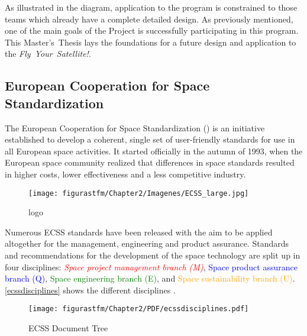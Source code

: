 As illustrated in the diagram, application to the program is constrained to those teams which already have a complete detailed design. As previously mentioned, one of the main goals of the  Project is successfully participating in this program. This Master's~Thesis lays the foundations for a future  design and application to the \textit{Fly~Your~Satellite!}.


\subsection{European Cooperation for Space Standardization}\label{sec:ECSS}


The European Cooperation for Space Standardization () is an initiative established to develop a coherent, single set of user-friendly standards for use in all European space activities. It started officially in the autumn of 1993, when the European space community realized that differences in space standards resulted in higher costs, lower effectiveness and a less competitive industry.

\begin{figure}[H]
				\centering
				\texttt{[image: figurastfm/Chapter2/Imagenes/ECSS\_large.jpg]}
				\vspace{0.3cm}
				\caption{ logo \cite{ecss}}
								\vspace{-1cm}

\end{figure}

Numerous ECSS standards have been released with the aim to be applied altogether for the management, engineering and product assurance. Standards and recommendations for the development of the space technology are split up in four disciplines: \textit{\textcolor{red}{Space project management branch (M)}}, \textcolor{blue}{Space product assurance branch (Q)}, \textcolor{green}{Space engineering branch (E)}, and \textcolor{orange}{Space sustainability branch (U)}. \autoref{ecssdisciplines} shows the different  disciplines \cite{ecssdescrip}.

		\begin{figure}[h]
			\centering
			\texttt{[image: figurastfm/Chapter2/PDF/ecssdisciplines.pdf]}
			\caption{ECSS Document Tree \cite{ecsstree}}
			\label{ecssdisciplines}
		\end{figure}



